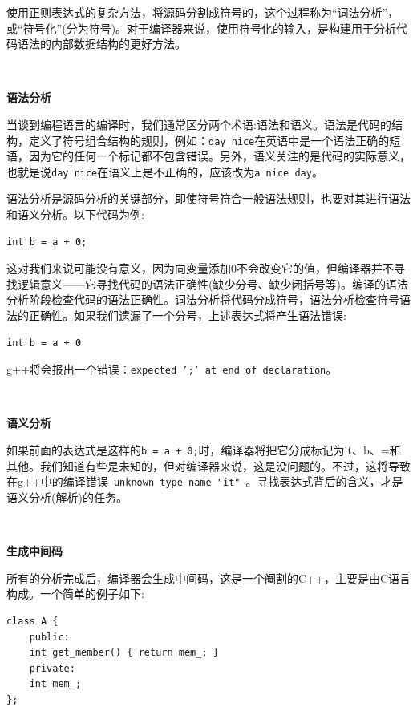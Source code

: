 使用正则表达式的复杂方法，将源码分割成符号的，这个过程称为“词法分析”，或“符号化”(分为符号)。对于编译器来说，使用符号化的输入，是构建用于分析代码语法的内部数据结构的更好方法。 \par
	
\noindent\textbf{}\ \par
\textbf{语法分析}\ \par	
当谈到编程语言的编译时，我们通常区分两个术语:语法和语义。语法是代码的结构，定义了符号组合结构的规则，例如：\texttt{day nice}在英语中是一个语法正确的短语，因为它的任何一个标记都不包含错误。另外，语义关注的是代码的实际意义，也就是说\texttt{day nice}在语义上是不正确的，应该改为\texttt{a nice day}。\par	
语法分析是源码分析的关键部分，即使符号符合一般语法规则，也要对其进行语法和语义分析。以下代码为例: \par

\begin{lstlisting}[caption={}]
int b = a + 0;
\end{lstlisting}	
	
这对我们来说可能没有意义，因为向变量添加0不会改变它的值，但编译器并不寻找逻辑意义——它寻找代码的语法正确性(缺少分号、缺少闭括号等)。编译的语法分析阶段检查代码的语法正确性。词法分析将代码分成符号，语法分析检查符号语法的正确性。如果我们遗漏了一个分号，上述表达式将产生语法错误: \par

\begin{lstlisting}[caption={}]
int b = a + 0
\end{lstlisting}	
	
g++将会报出一个错误：\texttt{expected ';' at end of declaration}。 \par
	
\noindent\textbf{}\ \par
\textbf{语义分析}\ \par	
如果前面的表达式是这样的\texttt{b = a + 0;}时，编译器将把它分成标记为it、b、=和其他。我们知道有些是未知的，但对编译器来说，这是没问题的。不过，这将导致在g++中的编译错误\texttt{ unknown type name "it" }。寻找表达式背后的含义，才是语义分析(解析)的任务。 \par

\noindent\textbf{}\ \par
\textbf{生成中间码}\ \par	
所有的分析完成后，编译器会生成中间码，这是一个阉割的C++，主要是由C语言构成。一个简单的例子如下: \par	

\begin{lstlisting}[caption={}]
class A {
	public:
	int get_member() { return mem_; }
	private:
	int mem_;
};
\end{lstlisting}	

